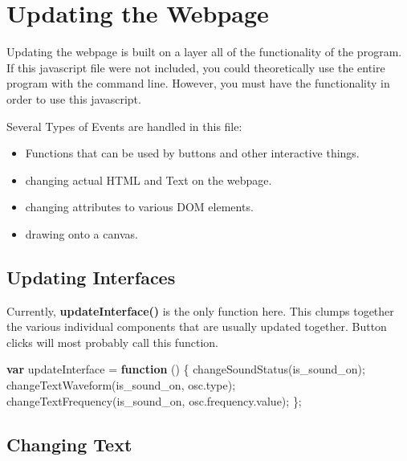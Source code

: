 \documentclass[]{article}
\date{}
\newenvironment{Shaded}{}{}
\newcommand{\KeywordTok}[1]{\textcolor[rgb]{0.00,0.44,0.13}{\textbf{#1}}}
\newcommand{\VariableTok}[1]{\textcolor[rgb]{0.10,0.09,0.49}{#1}}
\newcommand{\OperatorTok}[1]{\textcolor[rgb]{0.40,0.40,0.40}{#1}}
\newcommand{\AttributeTok}[1]{\textcolor[rgb]{0.49,0.56,0.16}{#1}}
\newcommand{\NormalTok}[1]{#1}
\providecommand{\tightlist}{%
  \setlength{\itemsep}{0pt}\setlength{\parskip}{0pt}}
\begin{document}
\section{Updating the Webpage}\label{updating-the-webpage}

Updating the webpage is built on a layer all of the functionality of the
program. If this javascript file were not included, you could
theoretically use the entire program with the command line. However, you
must have the functionality in order to use this javascript.

Several Types of Events are handled in this file:

\begin{itemize}
\tightlist
\item
  Functions that can be used by buttons and other interactive things.
\item
  changing actual HTML and Text on the webpage.
\item
  changing attributes to various DOM elements.
\item
  drawing onto a canvas.
\end{itemize}

\subsection{Updating Interfaces}\label{updating-interfaces}

Currently, \textbf{updateInterface()} is the only function here. This
clumps together the various individual components that are usually
updated together. Button clicks will most probably call this function.

\begin{Shaded}
\begin{Highlighting}[]
\KeywordTok{var}\NormalTok{ updateInterface }\OperatorTok{=} \KeywordTok{function}\NormalTok{ () }\OperatorTok{\{}
    \AttributeTok{changeSoundStatus}\NormalTok{(is_sound_on)}\OperatorTok{;}
    \AttributeTok{changeTextWaveform}\NormalTok{(is_sound_on}\OperatorTok{,} \VariableTok{osc}\NormalTok{.}\AttributeTok{type}\NormalTok{)}\OperatorTok{;}
    \AttributeTok{changeTextFrequency}\NormalTok{(is_sound_on}\OperatorTok{,} \VariableTok{osc}\NormalTok{.}\VariableTok{frequency}\NormalTok{.}\AttributeTok{value}\NormalTok{)}\OperatorTok{;}
\OperatorTok{\};}
\end{Highlighting}
\end{Shaded}

\subsection{Changing Text}\label{changing-text}
\end{document}
